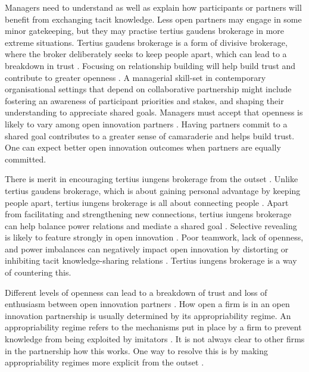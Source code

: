 Managers need to understand as well as explain how participants or partners will benefit from exchanging tacit knowledge. Less open partners may engage in some minor gatekeeping, but they may practise tertius gaudens brokerage in more extreme situations. Tertius gaudens brokerage is a form of divisive brokerage, where the broker deliberately seeks to keep people apart, which can lead to a breakdown in trust \citep{obstfeld2014brokerage}. Focusing on relationship building will help build trust and contribute to greater openness \citep{chiambaretto2019all}. A managerial skill-set in contemporary  organisational settings that depend on collaborative partnership might include fostering an awareness of participant priorities and stakes, and shaping their understanding to appreciate shared goals. Managers must accept that openness is likely to vary among open innovation partners \citep{dahlander2010open,oberg2019openness}. Having partners commit to a shared goal contributes to a greater sense of camaraderie and helps build trust. One can expect better open innovation outcomes when partners are equally committed. \medskip

There is merit in encouraging tertius iungens brokerage from the outset \citep{chiambaretto2019all}. Unlike tertius gaudens brokerage, which is about gaining personal advantage by keeping people apart, tertius iungens brokerage is all about connecting people \citep{obstfeld2014brokerage}. Apart from facilitating and strengthening new connections, tertius iungens brokerage can help balance power relations and mediate a shared goal \citep{chesbrough2012open}. Selective revealing is likely to feature strongly in open innovation \citep{kratzer2017open}. Poor teamwork, lack of openness, and power imbalances can negatively impact open innovation by distorting or inhibiting tacit knowledge-sharing relations \citep{bogers2018human}. Tertius iungens brokerage is a way of countering this. \medskip

Different levels of openness can lead to a breakdown of trust and loss of enthusiasm between open innovation partners \citep{laursen2014paradox, dragsdahl2019perspective}. How open a firm is in an open innovation partnership is usually determined by its appropriability regime. An appropriability regime refers to the mechanisms put in place by a firm to prevent knowledge from being exploited by imitators \citep{teece1998capturing, hurmelinna2008appropriability}. It is not always clear to other firms in the partnership how this works. One way to resolve this is by making appropriability regimes more explicit from the outset \citep{gama2019managing}. \medskip

